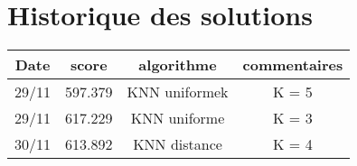 \section*{Historique des solutions}

\begin{tabular}{|c|c|c|c|}
  \hline
  Date & score & algorithme & commentaires \\
  \hline
  29/11 & 597.379 & KNN uniformek& K = 5\\
  \hline
  29/11 & 617.229 & KNN uniforme & K = 3\\
  30/11 & 613.892 & KNN distance & K = 4\\
\end{tabular}
